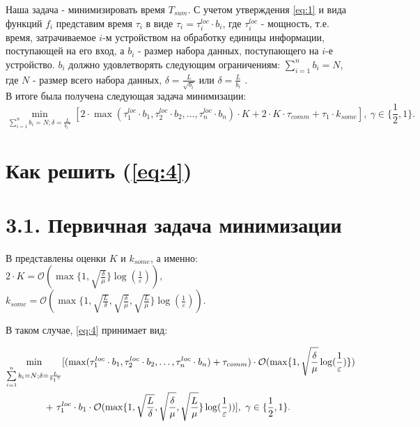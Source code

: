 \documentclass{article}
\theoremstyle{definition}
\theoremstyle{plain}
\begin{document}
Наша задача - минимизировать время $T_{sum}$. С учетом утверждения \eqref{eq:1} и вида функций $f_i$ представим время $\tau_i$ в виде $\tau_i = \tau_i^{loc}\cdot b_i$, где $\tau_i^{loc}$ - мощность, т.е. время, затрачиваемое $i$-м устройством на обработку единицы информации, поступающей на его вход, а $b_i$ - размер набора данных, поступающего на $i$-е устройство. $b_i$ должно удовлетворять следующим ограничениям: $\sum\limits_{i = 1}^{n} b_i = N$, где $N$ - размер всего набора данных, $\delta = \frac{L}{\sqrt{b_i}}$ или $\delta = \frac{L}{b_i}$ \cite{hendrikx2020statistically}.\\
В итоге была получена следующая задача минимизации:
\begin{equation}
    \label{eq:4}
    \underset{\sum\limits_{i = 1}^{n} b_i = N; \delta = \frac{L}{{b_1}^{\gamma}}}{\min}[ 2\cdot\max(\tau_1^{loc}\cdot b_1, \tau_2^{loc}\cdot b_2, \ldots, \tau_n^{loc}\cdot b_n)\cdot K + 2\cdot K\cdot\tau_{comm} + \tau_1\cdot k_{some}], ~ \gamma \in \{\frac{1}{2}, 1\}.
\end{equation}

\section{Как решить (\ref{eq:4})}

\section*{3.1. Первичная задача минимизации}
В \cite{kovalev2022optimal} представлены оценки $K$ и $k_{some}$, а именно: $2\cdot K = \mathcal O(\max\{1, \sqrt{\frac{\delta}{\mu}}\}\log(\frac{1}{\varepsilon})), $\\ $ k_{some} = \mathcal O(\max\{1, \sqrt{\frac{L}{\delta}}, \sqrt{\frac{\delta}{\mu}}, \sqrt{\frac{L}{\mu}}\}\log(\frac{1}{\varepsilon}))$. 

В таком случае, \eqref{eq:4} принимает вид:

\begin{eqnarray}
    \begin{split}
    \label{eq:5}
        \underset{\sum\limits_{i = 1}^{n} b_i = N; \delta = \frac{L}{{b_1}^\gamma}}{\min}[(\max(\tau_1^{loc}\cdot b_1, \tau_2^{loc}\cdot b_2, \ldots, \tau_n^{loc}\cdot b_n) + \tau_{comm}) \cdot \mathcal O(\max\{1, \sqrt{\frac{\delta}{\mu}}\log(\frac{1}{\varepsilon})\}) 
        \\ + ~
        \tau_1^{loc}\cdot b_1\cdot\mathcal O(\max\{1,\sqrt{\frac{L}{\delta}}, \sqrt{\frac{\delta}{\mu}}, \sqrt{\frac{L}{\mu}}\}\log(\frac{1}{\varepsilon}))] ,  ~ \gamma \in \{\frac{1}{2}, 1\}. \hspace{2.4cm}
    \end{split}
\end{eqnarray}
\end{document}
